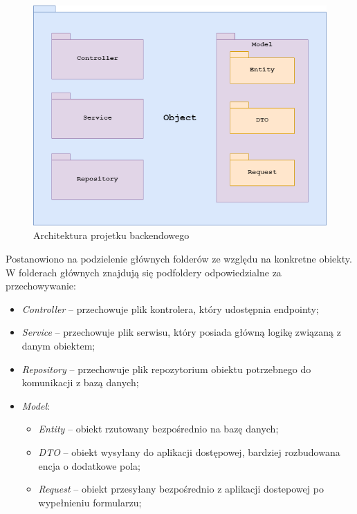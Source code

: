 \begin{figure}[H]
  \centering
  \includegraphics[width=0.7\linewidth]{rysunki/packages.png}
  \caption{Architektura projetku backendowego}
  \label{fig:java-architecture-2}
\end{figure}

Postanowiono na podzielenie głównych folderów ze względu na konkretne obiekty.
W folderach głównych znajdują się podfoldery odpowiedzialne za przechowywanie: 
\begin{itemize}[leftmargin=1cm]
  \item \textit{Controller} -- przechowuje plik kontrolera, który udostępnia endpointy;
  \item \textit{Service} -- przechowuje plik serwisu, który posiada główną logikę związaną z danym obiektem;
  \item \textit{Repository} -- przechowuje plik repozytorium obiektu potrzebnego do komunikacji z bazą danych;
  \item \textit{Model}:
  \begin{itemize}
    \item \textit{Entity} -- obiekt rzutowany bezpośrednio na bazę danych;
    \item \textit{DTO} -- obiekt wysyłany do aplikacji dostępowej, bardziej rozbudowana encja o dodatkowe pola;
    \item \textit{Request} -- obiekt przesyłany bezpośrednio z aplikacji dostepowej po wypełnieniu formularzu;
  \end{itemize}
\end{itemize}

